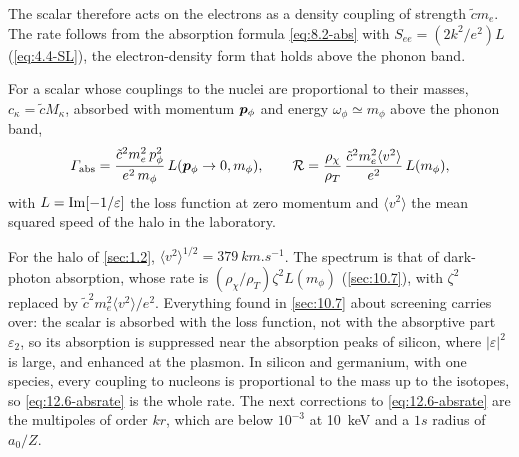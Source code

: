 The scalar therefore acts on the electrons as a density coupling of strength $\tilde cm_e$. The rate follows from the absorption formula \cref{eq:8.2-abs} with $S_{ee} = (2k^2/e^2)L$ (\cref{eq:4.4-SL}), the electron-density form that holds above the phonon band.
\begin{keyresult}
For a scalar whose couplings to the nuclei are proportional to their masses, $c_\kappa = \tilde cM_\kappa$, absorbed with momentum $\bm{p}_\phi$ and energy $\omega_\phi \simeq m_\phi$ above the phonon band,
\begin{equation}
  \varGamma_{\mathrm{abs}} = \frac{\tilde c^2m_e^2\,p_\phi^2}{e^2\,m_\phi}\,L(\bm{p}_\phi \to 0, m_\phi) , \qquad
  \mathcal{R} = \frac{\rho_\chi}{\rho_T}\,\frac{\tilde c^2m_e^2\langle v^2\rangle}{e^2}\,L(m_\phi) ,
  \label{eq:12.6-absrate}
\end{equation}
with $L = \operatorname{Im}[-1/\varepsilon]$ the loss function at zero momentum and $\langle v^2\rangle$ the mean squared speed of the halo in the laboratory.
\end{keyresult}
\noindent For the halo of \cref{sec:1.2}, $\langle v^2\rangle^{1/2} = \SI{379}{km.s^{-1}}$. The spectrum is that of dark-photon absorption, whose rate is $(\rho_\chi/\rho_T)\zeta^2L(m_\phi)$ (\cref{sec:10.7}), with $\zeta^2$ replaced by $\tilde c^2m_e^2\langle v^2\rangle/e^2$. Everything found in \cref{sec:10.7} about screening carries over: the scalar is absorbed with the loss function, not with the absorptive part $\varepsilon_2$, so its absorption is suppressed near the absorption peaks of silicon, where $|\varepsilon|^2$ is large, and enhanced at the plasmon. In silicon and germanium, with one species, every coupling to nucleons is proportional to the mass up to the isotopes, so \cref{eq:12.6-absrate} is the whole rate. The next corrections to \cref{eq:12.6-absrate} are the multipoles of order $kr$, which are below $10^{-3}$ at \SI{10}{keV} and a $1s$ radius of $a_0/Z$.

